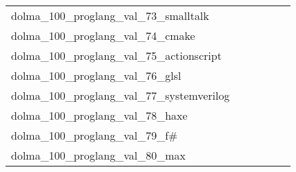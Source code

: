 {\begin{longtable}{m{6cm}m{1.7cm}m{1.7cm}m{1.7cm}m{1.7cm}m{1.7cm}}
	dolma\_100\_proglang\_val\_73\_smalltalk  & \colorbox[HTML]{9dd687}{\makebox[\mywidth][c]{9.32}} & \colorbox[HTML]{d4eea0}{\makebox[\mywidth][c]{9.61}} & \colorbox[HTML]{ffffe5}{\makebox[\mywidth][c]{12.60}} & \colorbox[HTML]{bde395}{\makebox[\mywidth][c]{9.47}} & \colorbox[HTML]{77c578}{\makebox[\mywidth][c]{9.20}}\\
	dolma\_100\_proglang\_val\_74\_cmake  & \colorbox[HTML]{f9fdc9}{\makebox[\mywidth][c]{1.87}} & \colorbox[HTML]{f4fab6}{\makebox[\mywidth][c]{1.86}} & \colorbox[HTML]{ffffe5}{\makebox[\mywidth][c]{2.02}} & \colorbox[HTML]{ddf1a6}{\makebox[\mywidth][c]{1.84}} & \colorbox[HTML]{77c578}{\makebox[\mywidth][c]{1.81}}\\
	dolma\_100\_proglang\_val\_75\_actionscript  & \colorbox[HTML]{77c578}{\makebox[\mywidth][c]{2.45}} & \colorbox[HTML]{eff8b3}{\makebox[\mywidth][c]{2.54}} & \colorbox[HTML]{ffffe5}{\makebox[\mywidth][c]{2.88}} & \colorbox[HTML]{87cc7f}{\makebox[\mywidth][c]{2.46}} & \colorbox[HTML]{9ad486}{\makebox[\mywidth][c]{2.46}}\\
	dolma\_100\_proglang\_val\_76\_glsl  & \colorbox[HTML]{edf8b2}{\makebox[\mywidth][c]{2.40}} & \colorbox[HTML]{f6fbb8}{\makebox[\mywidth][c]{2.42}} & \colorbox[HTML]{ffffe5}{\makebox[\mywidth][c]{2.72}} & \colorbox[HTML]{c2e698}{\makebox[\mywidth][c]{2.36}} & \colorbox[HTML]{77c578}{\makebox[\mywidth][c]{2.32}}\\
	dolma\_100\_proglang\_val\_77\_systemverilog  & \colorbox[HTML]{77c578}{\makebox[\mywidth][c]{2.53}} & \colorbox[HTML]{f0f9b4}{\makebox[\mywidth][c]{2.66}} & \colorbox[HTML]{ffffe5}{\makebox[\mywidth][c]{3.17}} & \colorbox[HTML]{bee496}{\makebox[\mywidth][c]{2.58}} & \colorbox[HTML]{9fd688}{\makebox[\mywidth][c]{2.55}}\\
	dolma\_100\_proglang\_val\_78\_haxe  & \colorbox[HTML]{77c578}{\makebox[\mywidth][c]{2.74}} & \colorbox[HTML]{e1f3a9}{\makebox[\mywidth][c]{2.81}} & \colorbox[HTML]{ffffe5}{\makebox[\mywidth][c]{3.20}} & \colorbox[HTML]{bee496}{\makebox[\mywidth][c]{2.77}} & \colorbox[HTML]{a9db8c}{\makebox[\mywidth][c]{2.76}}\\
	dolma\_100\_proglang\_val\_79\_f\#  & \colorbox[HTML]{7fc97b}{\makebox[\mywidth][c]{2.89}} & \colorbox[HTML]{eff8b3}{\makebox[\mywidth][c]{3.02}} & \colorbox[HTML]{ffffe5}{\makebox[\mywidth][c]{3.53}} & \colorbox[HTML]{bbe395}{\makebox[\mywidth][c]{2.93}} & \colorbox[HTML]{77c578}{\makebox[\mywidth][c]{2.88}}\\
	dolma\_100\_proglang\_val\_80\_max  & \colorbox[HTML]{77c578}{\makebox[\mywidth][c]{1.59}} & \colorbox[HTML]{d9f0a3}{\makebox[\mywidth][c]{1.62}} & \colorbox[HTML]{ffffe5}{\makebox[\mywidth][c]{1.80}} & \colorbox[HTML]{cdeb9d}{\makebox[\mywidth][c]{1.61}} & \colorbox[HTML]{b8e293}{\makebox[\mywidth][c]{1.61}}\\

\end{longtable}}
